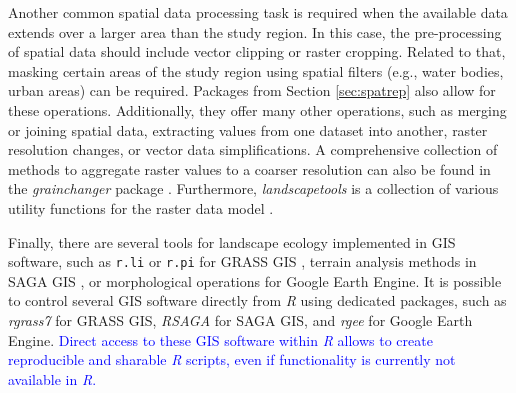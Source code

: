 \documentclass[smallextended]{svjour3}       %
\begin{document}
Another common spatial data processing task is required when the available data extends over a larger area than the study region.
In this case, the pre-processing of spatial data should include vector clipping or raster cropping.
Related to that, masking certain areas of the study region using spatial filters (e.g., water bodies, urban areas) can be required.
Packages from Section \ref{sec:spatrep} also allow for these operations.
Additionally, they offer many other operations, such as merging or joining spatial data, extracting values from one dataset into another, raster resolution changes, or vector data simplifications.
A comprehensive collection of methods to aggregate raster values to a coarser resolution can also be found in the \textit{grainchanger} package \cite{Graham2019}.
Furthermore, \textit{landscapetools} is a collection of various utility functions for the raster data model \cite{Sciaini2018}.

Finally, there are several tools for landscape ecology implemented in GIS software, such as \texttt{r.li} or \texttt{r.pi} for GRASS GIS \cite{Wegmann2018,Neteler2012,Porta2017}, terrain analysis methods in SAGA GIS \cite{Conrad2015}, or morphological operations for Google Earth Engine.
It is possible to control several GIS software directly from \textit{R} using dedicated packages, such as \textit{rgrass7} \cite{Bivand2021} for GRASS GIS, \textit{RSAGA} \cite{Brenning2018} for SAGA GIS, and \textit{rgee} \cite{Aybar2020} for Google Earth Engine.
\textcolor{blue}{Direct access to these GIS software within \textit{R} allows to create reproducible and sharable \textit{R} scripts, even if functionality is currently not available in \textit{R}.}
\end{document}
